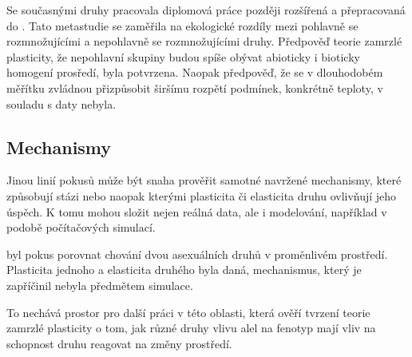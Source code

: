 Se současnými druhy  pracovala diplomová práce \citet{toman2013} později rozšířená a přepracovaná do \citet{toman2015}.
Tato metastudie se zaměřila na ekologické rozdíly mezi pohlavně se rozmnožujícími a nepohlavně se rozmnožujícími druhy.
Předpověď teorie zamrzlé plasticity, že nepohlavní skupiny budou spíše obývat abioticky i bioticky homogení prosředí,
byla potvrzena. Naopak předpověď, že se v dlouhodobém měřítku zvládnou přizpůsobit širšímu rozpětí podmínek, konkrétně
teploty, v souladu s daty nebyla.

\subsection{Mechanismy}

Jinou linií pokusů může být snaha prověřit samotné navržené mechanismy, které způsobují stázi nebo naopak kterými
plasticita či elasticita druhu ovlivňují jeho úspěch. K tomu mohou složit nejen reálná data, ale i
modelování, například v podobě počítačových simulací.

\citet{Flegr139030} byl pokus porovnat chování dvou asexuálních druhů v proměnlivém prostředí. Plasticita jednoho a
elasticita druhého byla daná, mechanismus, který je zapříčinil nebyla předmětem simulace.

To nechává prostor pro další práci v této oblasti, která ověří tvrzení teorie zamrzlé plasticity o tom, jak
různé druhy vlivu alel na fenotyp mají vliv na schopnost druhu reagovat na změny prostředí.